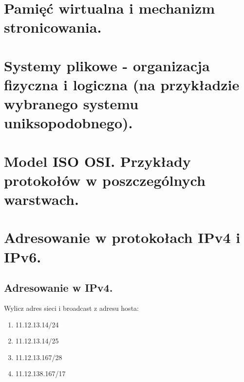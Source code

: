 \documentclass[12pt]{article}
\begin{document}
    \section{Pamięć wirtualna i mechanizm stronicowania.}
    \section{Systemy plikowe - organizacja fizyczna i logiczna (na przykładzie wybranego systemu uniksopodobnego).}
    \section{Model ISO OSI. Przykłady protokołów w poszczególnych warstwach.}

    \newpage

    \section{Adresowanie w protokołach IPv4 i IPv6.}

    \subsection{Adresowanie w IPv4.}

    \begin{exercise}
        Wylicz adres sieci i broadcast z adresu hosta:
        \begin{enumerate}
            \item 11.12.13.14/24
            \item 11.12.13.14/25
            \item 11.12.13.167/28
            \item 11.12.138.167/17
        \end{enumerate}
    \end{exercise}
\end{document}
